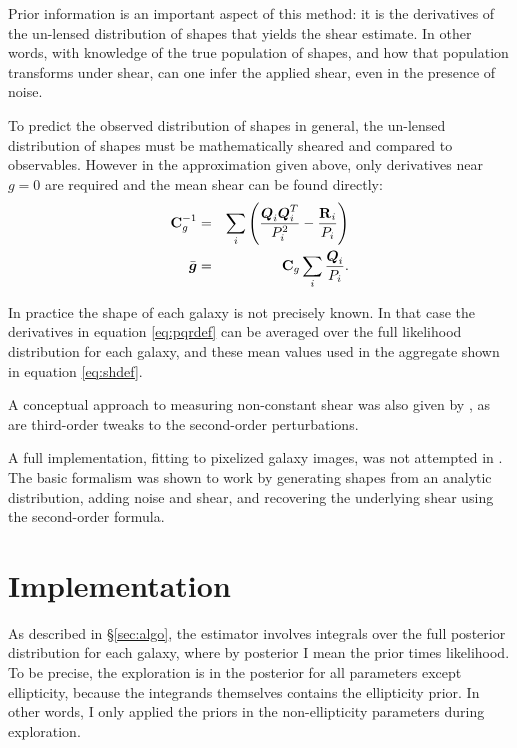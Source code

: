 \documentclass[12pt,preprint]{aastex}
\newcommand{\vecg}{\mbox{\boldmath $g$}}
\newcommand{\vecD}{\mbox{\boldmath $D$}}
\newcommand{\vecQ}{\mbox{\boldmath $Q$}}
\newcommand{\matR}{\mbox{$\bf R$}}
\newcommand{\matC}{\mbox{$\bf C$}}
\newcommand{\bnabg}{ \boldsymbol{\nabla_g}}
\begin{document}
Prior information is an important aspect of this method: it is the derivatives
of the un-lensed distribution of shapes that yields the shear estimate.  In
other words, with knowledge of the true population of shapes, and how that
population transforms under shear, can one infer the applied shear, even in the
presence of noise.

To predict the observed distribution of shapes in
general, the un-lensed distribution of shapes must be mathematically sheared
and compared to observables.  However in the approximation given above, only
derivatives near $g=0$ are required and the mean shear can be found directly:
\begin{eqnarray} \label{eq:shdef}
\matC_g^{-1} & = & \sum_i \left(\frac{\vecQ_i \vecQ^T_i}{P_i^2} - \frac{\matR_i}{P_i}\right) \\
\bar{\vecg} & = &  \matC_g \sum_i \frac{\vecQ_i}{P_i}.
\end{eqnarray}

In practice the shape of each galaxy is not precisely known. In that case the
derivatives in equation \ref{eq:pqrdef} can be averaged over the full
likelihood distribution for each galaxy, and these mean values used
in the aggregate shown in equation \ref{eq:shdef}.  

A conceptual approach to measuring non-constant shear was also given by
\cite{ba14}, as are third-order tweaks to the second-order perturbations.

A full implementation, fitting to pixelized galaxy images, was not attempted in
\citet{ba14}.  The basic formalism was shown to work by generating shapes from
an analytic distribution, adding noise and shear, and recovering the underlying
shear using the second-order formula.

\section{Implementation} \label{sec:impl}

As described in \S \ref{sec:algo}, the estimator involves integrals over the
full posterior distribution for each galaxy, where by posterior I mean the
prior times likelihood.  To be precise, the exploration is in the posterior for
all parameters except ellipticity, because the integrands themselves contains
the ellipticity prior. In other words, I only applied the priors in the
non-ellipticity parameters during exploration.
\end{document}
